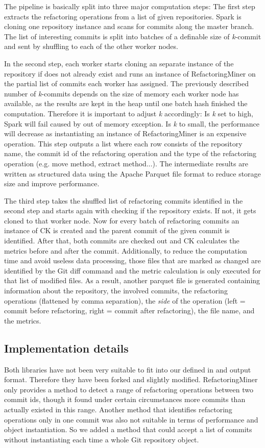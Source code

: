 The pipeline is basically split into three major computation steps: The first step extracts the refactoring operations from a list of given repositories. Spark is cloning one repository instance and scans for commits along the master branch. The list of interesting commits is split into batches of a definable size of \emph{k}-commit and sent by shuffling to each of the other worker nodes.

In the second step, each worker starts cloning an separate instance of the repository if does not already exist and runs an instance of RefactoringMiner on the partial list of commits each worker has assigned. The previously described number of \emph{k}-commits depends on the size of memory each worker node has available, as the results are kept in the heap until one batch hash finished the computation. Therefore it is important to adjust \emph{k} accordingly: Is \emph{k} set to high, Spark will fail caused by out of memory exception. Is \emph{k} to small, the performance will decrease as instantiating an instance of RefactoringMiner is an expensive operation. This step outputs a list where each row consists of the repository name, the commit id of the refactoring operation and the type of the refactoring operation (e.g. move method, extract method...). The intermediate results are written as structured data using the Apache Parquet file format \cite{parquet} to reduce storage size and improve performance.

The third step takes the shuffled list of refactoring commits identified in the second step and starts again with checking if the repository exists. If not, it gets cloned to that worker node. Now for every batch of refactoring commits an instance of CK is created and the parent commit of the given commit is identified. After that, both commits are checked out and CK calculates the metrics before and after the commit. Additionally, to reduce the computation time and avoid useless data processing, those files that are marked as changed are identified by the Git diff command and the metric calculation is only executed for that list of modified files. As a result, another parquet file is generated containing information about the repository, the involved commits, the refactoring operations (flattened by comma separation), the \emph{side} of the operation (left = commit before refactoring, right = commit after refactoring), the file name, and the metrics.

\subsection{Implementation details}
Both libraries have not been very suitable to fit into our defined in and output format. Therefore they have been forked and slightly modified. RefactoringMiner only provides a method to detect a range of refactoring operations between two commit ids, though it found under certain circumstances more commits than actually existed in this range. Another method that identifies refactoring operations only in one commit was also not suitable in terms of performance and object instantiation. So we added a method that could accept a list of commits without instantiating each time a whole Git repository object. 

